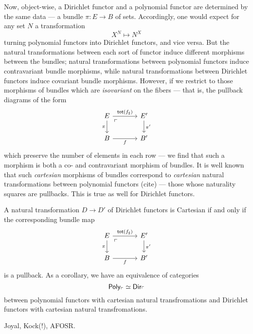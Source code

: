 Now, object-wise, a Dirichlet functor and a polynomial functor are determined by
the same data --- a bundle $\pi : E \to B$ of sets. Accordingly, one would
expect for any set $N$ a transformation
$$X^N \mapsto N^X$$
turning polynomial functors into Dirichlet functors, and vice versa. But the
natural transformations between each sort of functor induce different morphisms
between the bundles; natural transformations between polynomial functors induce
contravariant bundle morphisms, while natural transformations between Dirichlet
functors induce covariant bundle morphisms. However, if we restrict to those
morphisms of bundles which are \emph{isovariant} on the fibers --- that is, the
pullback diagrams of the form
\[
  \begin{tikzcd}[column sep=large]
E \arrow[r, "\term{tot}(f_{\sharp})"] \arrow[d, "\pi"'] \arrow[dr, phantom,
"\ulcorner" very near start] & E' \arrow[d, "\pi'"] \\
B \arrow[r, "f"']                                       & B'                  
\end{tikzcd}
\]
which preserve the number of elements in each row --- we find that such a morphism
is both a co- and contravariant morphism of bundles. It is well known that such
\emph{cartesian} morphisms of bundles correspond to \emph{cartesian} natural
transformations between polynomial functors (cite) --- those whose naturality
squares are pullbacks. This is true as well for Dirichlet functors.
\begin{thm}
A natural transformation $D \to D'$ of Dirichlet functors is Cartesian if and
only if the corresponding bundle map
\[
  \begin{tikzcd}[column sep=large]
E \arrow[r, "\term{tot}(f_{\sharp})"] \arrow[d, "\pi"'] \arrow[dr, phantom,
"\ulcorner" very near start] & E' \arrow[d, "\pi'"] \\
B \arrow[r, "f"']                                       & B'                  
\end{tikzcd}
\]
is a pullback. As a corollary, we have an equivalence of categories
$$\mathsf{{Poly}}_{\ulcorner} \simeq \operatorname{\mathsf{{Dir}}}_{\ulcorner}$$
between polynomial functors with cartesian natural transfromations and Dirichlet
functors with cartesian natural transfromations.
\end{thm}



\begin{acknowledgements}
Joyal, Kock(!), AFOSR.
\end{acknowledgements}


